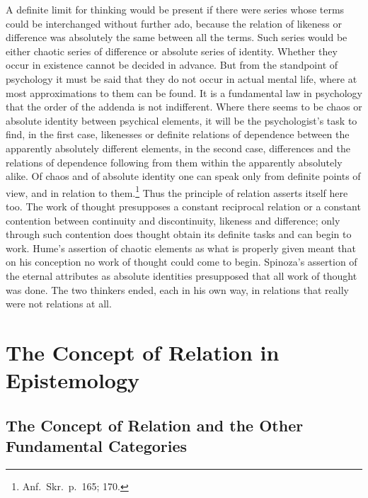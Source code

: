 \documentclass[12pt]{article}
\newcommand{\opage}[1]{\marginnote{\footnotesize\textit{[#1]}}}
\begin{document}
\bigskip
A definite limit for thinking would be present if there were series whose
terms could be interchanged without further ado, because the relation of
likeness or difference was absolutely the same between all the terms. Such
series would be either chaotic series of difference or absolute series of
identity. Whether they occur in existence cannot be decided in advance. But
from the standpoint of psychology it must be said that they do not occur in
actual mental life, where at most approximations to them can be found. It is
a fundamental law in psychology that the order of the addenda is not
indifferent. Where there seems to be chaos or absolute identity between
psychical elements, it will be the psychologist's task to find, in the first
case, likenesses or definite relations of dependence between the apparently
absolutely different elements, in the second case, differences and the
relations of dependence following from them within the apparently absolutely
alike. Of chaos and of absolute identity one can speak only from definite
points of view, and in relation to them.\footnote{Anf.\ Skr.\ p.~165; 170.}
Thus the principle of relation asserts itself here too. The work of thought
presupposes a constant reciprocal relation or a constant contention between
continuity and discontinuity, likeness and difference; only through such
contention does thought obtain its definite tasks and can begin to work.
Hume's assertion of chaotic elements as what is properly given meant that on
his conception no work of thought could come to begin. Spinoza's assertion
of the eternal attributes \opage{26}as absolute identities presupposed that all work
of thought was done. The two thinkers ended, each in his own way, in
relations that really were not relations at all.



\section{The Concept of Relation in Epistemology}
\label{sec:3}

\subsection{The Concept of Relation and the Other Fundamental Categories}
\label{sec:3a}
\end{document}
